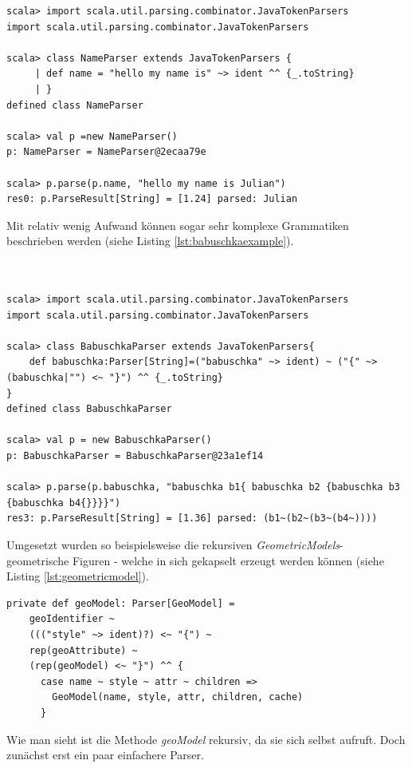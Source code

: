 \begin{lstlisting}[style=scala, caption={Einfaches Beispiel für einen Namens Parser}, label = {lst:simpleparserexample}]
scala> import scala.util.parsing.combinator.JavaTokenParsers
import scala.util.parsing.combinator.JavaTokenParsers

scala> class NameParser extends JavaTokenParsers {
     | def name = "hello my name is" ~> ident ^^ {_.toString}
     | }
defined class NameParser

scala> val p =new NameParser()
p: NameParser = NameParser@2ecaa79e

scala> p.parse(p.name, "hello my name is Julian")
res0: p.ParseResult[String] = [1.24] parsed: Julian
\end{lstlisting}Mit relativ wenig Aufwand können sogar sehr komplexe Grammatiken beschrieben werden (siehe Listing \ref{lst:babuschkaexample}).\\\\\\
\begin{lstlisting}[style=scala, caption={Einfaches Beispiel zum Parsen einer rekursiven Grammatik}, label = {lst:babuschkaexample}]
scala> import scala.util.parsing.combinator.JavaTokenParsers
import scala.util.parsing.combinator.JavaTokenParsers

scala> class BabuschkaParser extends JavaTokenParsers{
	def babuschka:Parser[String]=("babuschka" ~> ident) ~ ("{" ~> (babuschka|"") <~ "}") ^^ {_.toString}
}
defined class BabuschkaParser

scala> val p = new BabuschkaParser()
p: BabuschkaParser = BabuschkaParser@23a1ef14

scala> p.parse(p.babuschka, "babuschka b1{ babuschka b2 {babuschka b3 {babuschka b4{}}}}")
res3: p.ParseResult[String] = [1.36] parsed: (b1~(b2~(b3~(b4~))))
\end{lstlisting}Umgesetzt wurden so beispielsweise die rekursiven \textit{GeometricModels}- geometrische Figuren - welche in sich gekapselt erzeugt werden können (siehe Listing \ref{lst:geometricmodel}).
\begin{lstlisting}[style=scala, caption={Rekursive Methode zum Parsen geometrischer Figuren}, label = {lst:geometricmodel}]
private def geoModel: Parser[GeoModel] =
    geoIdentifier ~
    ((("style" ~> ident)?) <~ "{") ~
    rep(geoAttribute) ~
    (rep(geoModel) <~ "}") ^^ {
      case name ~ style ~ attr ~ children =>
        GeoModel(name, style, attr, children, cache)
      }
\end{lstlisting}Wie man sieht ist die Methode \textit{geoModel} rekursiv, da sie sich selbst aufruft. Doch zunächst erst ein paar einfachere Parser.
